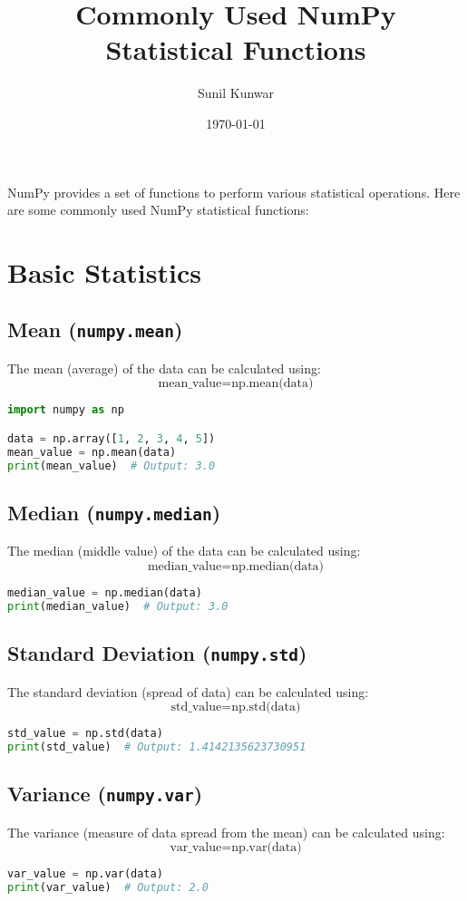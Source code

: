\documentclass[a4paper, 12pt]{article}
\title{Commonly Used NumPy Statistical Functions}
\author{Sunil Kunwar}
\date{\today}
\begin{document}
\maketitle

NumPy provides a set of functions to perform various statistical operations. Here are some commonly used NumPy statistical functions:

\section{Basic Statistics}

\subsection{ Mean (\texttt{numpy.mean})}
The mean (average) of the data can be calculated using:
\[
\text{mean\_value} = \text{np.mean(data)}
\]
\begin{lstlisting}[language=Python]
import numpy as np

data = np.array([1, 2, 3, 4, 5])
mean_value = np.mean(data)
print(mean_value)  # Output: 3.0
\end{lstlisting}

\subsection{ Median (\texttt{numpy.median})}
The median (middle value) of the data can be calculated using:
\[
\text{median\_value} = \text{np.median(data)}
\]
\begin{lstlisting}[language=Python]
median_value = np.median(data)
print(median_value)  # Output: 3.0
\end{lstlisting}

\subsection{ Standard Deviation (\texttt{numpy.std})}
The standard deviation (spread of data) can be calculated using:
\[
\text{std\_value} = \text{np.std(data)}
\]
\begin{lstlisting}[language=Python]
std_value = np.std(data)
print(std_value)  # Output: 1.4142135623730951
\end{lstlisting}

\subsection{ Variance (\texttt{numpy.var})}
The variance (measure of data spread from the mean) can be calculated using:
\[
\text{var\_value} = \text{np.var(data)}
\]
\begin{lstlisting}[language=Python]
var_value = np.var(data)
print(var_value)  # Output: 2.0
\end{lstlisting}
\end{document}
